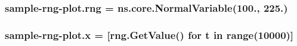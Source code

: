 \subsubsection[{\texorpdfstring{rng}{rng}}]{\setlength{\rightskip}{0pt plus 5cm}sample-\/rng-\/plot.\+rng = ns.\+core.\+Normal\+Variable(100., 225.)}\hypertarget{namespacesample-rng-plot_a97a9861d8531a085e4641cd8dc918a97}{}\label{namespacesample-rng-plot_a97a9861d8531a085e4641cd8dc918a97}
\subsubsection[{\texorpdfstring{x}{x}}]{ sample-\/{\bf rng}-\/plot.\+x = \mbox{[}rng.\+Get\+Value() for t in range(10000)\mbox{]}}\hypertarget{namespacesample-rng-plot_a5b903688ba4a0e9d00ef4d0aa174b44f}{}\label{namespacesample-rng-plot_a5b903688ba4a0e9d00ef4d0aa174b44f}
